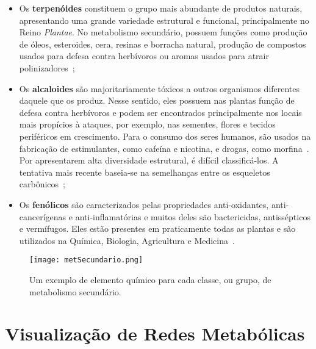 \begin{itemize}
\item Os \textbf{terpenóides} constituem o grupo mais abundante de produtos naturais, apresentando uma grande variedade estrutural e funcional, principalmente no Reino \textit{Plantae}. No metabolismo secundário, possuem funções como produção de óleos, esteroides, cera, resinas e borracha natural, produção de compostos usados para defesa contra herbívoros ou aromas usados para atrair polinizadores~\cite{Cap3schomburg};

\item Os \textbf{alcaloides} são majoritariamente tóxicos a outros organismos diferentes daquele que os produz. Nesse sentido, eles possuem nas plantas função de defesa contra herbívoros e podem ser encontrados principalmente nos locais mais propícios à ataques, por exemplo, nas sementes, flores e tecidos periféricos em crescimento. Para o consumo dos seres humanos, são usados na fabricação de estimulantes, como cafeína e nicotina, e drogas, como morfina~\cite{Cap3schomburg}. Por apresentarem alta diversidade estrutural, é difícil classificá-los. A tentativa mais recente baseia-se na semelhanças entre os esqueletos carbônicos~\cite{kabera14};

\item Os \textbf{fenólicos} são caracterizados pelas propriedades anti-oxidantes, anti-cancerígenas e anti-inflamatórias e muitos deles são bactericidas, antissépticos e vermífugos. Eles estão presentes em praticamente todas as plantas e são utilizados na Química, Biologia, Agricultura e Medicina~\cite{kabera14}.
\end{itemize}

\begin{figure}[h]
    \centering
    \texttt{[image: metSecundario.png]}
    \caption{Um exemplo de elemento químico para cada classe, ou grupo, de metabolismo secundário.}
    \label{fig:metSecundario}
\end{figure} 


\section{Visualização de Redes Metabólicas} \label{BDredes}



